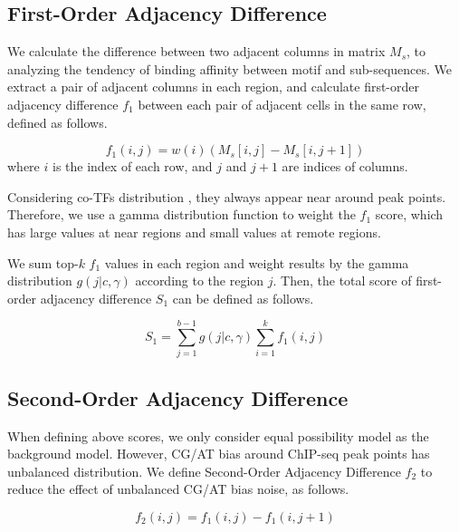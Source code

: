 \documentclass[journal,transmag]{IEEEtran}
\begin{document}
\subsection{First-Order Adjacency Difference}

We calculate the difference between two adjacent columns in matrix
$M_{s}$, to analyzing the tendency of binding affinity between motif
and sub-sequences. We extract a pair of adjacent columns in each
region, and calculate first-order adjacency difference $f_{1}$
between each pair of adjacent cells in the same row, defined as
follows.

\begin{equation}
\label{one_order_diff} f_{1}(i, j) = w(i) ( M_{s}[i,j] -
M_{s}[i,j+1] )
\end{equation}
where $i$ is the index of each row, and $j$ and $j+1$ are indices of
columns.


Considering co-TFs distribution
\cite{mybibifle:centdistgenomic,mybibfile:centdistsignal,mybibfile:centdistnucleo},
they always appear near around peak points. Therefore, we use a
gamma distribution function \cite{mybibfile:gammadist} to weight the
$f_{1}$ score, which has large values at near regions and small
values at remote regions.

We sum top-$k$ $f_{1}$ values in each region and weight results by
the gamma distribution $g(j|c,\gamma)$ according to the region $j$.
Then, the total score of first-order adjacency difference $S_{1}$
can be defined as follows.

\begin{equation}
\label{score_f_equ} S_{1} = \sum\limits_{j=1}^{b-1} g(j|c,\gamma)
\sum\limits_{i=1}^{k} f_{1}(i, j)
\end{equation}


\subsection{Second-Order Adjacency Difference}

When defining above scores, we only consider equal possibility model
as the background model. However, CG/AT bias around ChIP-seq peak
points has unbalanced distribution. We define Second-Order Adjacency
Difference $f_{2}$ to reduce the effect of unbalanced CG/AT bias
noise, as follows.

\begin{equation}
\label{two_order_diff} f_{2}(i, j) = f_{1}(i, j) - f_{1}(i, j+1)
\end{equation}
\end{document}
